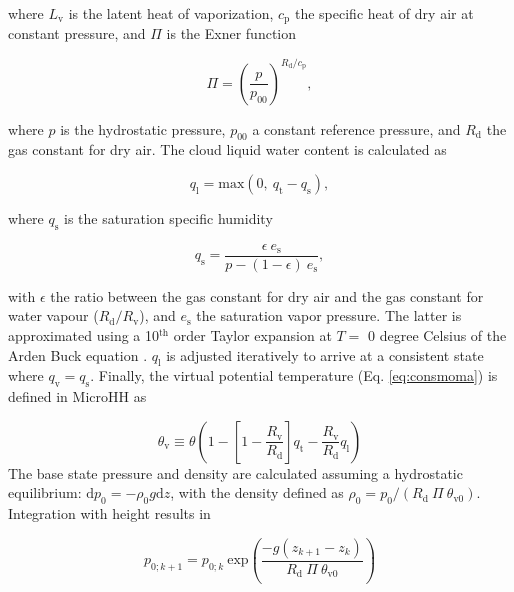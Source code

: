 \documentclass[gmd,manuscript]{copernicus}
\begin{document}
\noindent where $L_\mathrm{v}$ is the latent heat of vaporization, $c_\mathrm{p}$ the specific heat of dry air at constant pressure, and $\Pi$ is the Exner function

\begin{equation}
\Pi = \left( \frac{p}{p_{00}} \right)^{R_\mathrm{d} / c_\mathrm{p}},
\end{equation}

\noindent where $p$ is the hydrostatic pressure, $p_\mathrm{00}$ a constant reference pressure, and $R_\mathrm{d}$ the gas constant for dry air. The cloud liquid water content is calculated as

\begin{equation}
q_\mathrm{l} = \mathrm{max}(0, ~q_\mathrm{t} - q_\mathrm{s}),
\end{equation}

\noindent where $q_\mathrm{s}$ is the saturation specific humidity

\begin{equation}
q_\mathrm{s} = \frac{\epsilon ~ e_\mathrm{s}}{p - (1-\epsilon) ~ e_\mathrm{s}},
\end{equation}

\noindent with $\epsilon$ the ratio between the gas constant for dry air and the gas constant for water vapour ($R_\mathrm{d}/R_\mathrm{v}$), and $e_\mathrm{s}$ the saturation vapor pressure. The latter is approximated using a 10$^\mathrm{th}$ order Taylor expansion at $T=$ 0 degree Celsius of the Arden Buck equation \citep{Buck1981}. $q_\mathrm{l}$ is adjusted iteratively to arrive at a consistent state where $q_\mathrm{v} = q_\mathrm{s}$. Finally, the virtual potential temperature (Eq. \ref{eq:consmoma}) is defined in MicroHH as 

\begin{equation}
\theta_\mathrm{v} \equiv  \theta \left(1-\left[1-\frac{R_\mathrm{v}}{R_\mathrm{d}}\right] q_\mathrm{t} - \frac{R_\mathrm{v}}{R_\mathrm{d}} q_\mathrm{l} \right)
\end{equation}
The base state pressure and density are calculated assuming a hydrostatic equilibrium: $\mathrm{d}p_0 = -\rho_0 g \mathrm{d}z$, with the density defined as $\rho_0 = p_0 / (R_\mathrm{d} ~ \Pi ~ \theta_\mathrm{v0})$. Integration with height results in

\begin{equation}
p_{0;k+1} = p_{0;k} ~ \mathrm{exp}\left(\frac{-g (z_{k+1}-z_k)}{R_\mathrm{d} ~ \Pi ~ \theta_\mathrm{v0}} \right )
\end{equation}
\end{document}
